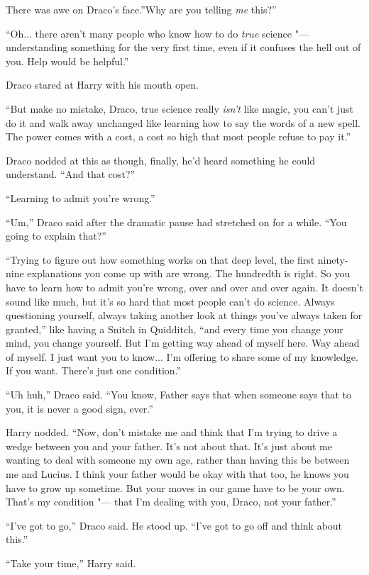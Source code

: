 There was awe on Draco's face.''Why are you telling \emph{me} this?''

``Oh... there aren't many people who know how to do \emph{true}
science "--- understanding something for the very first time, even if it
confuses the hell out of you. Help would be helpful.''

Draco stared at Harry with his mouth open.

``But make no mistake, Draco, true science really \emph{isn't} like
magic, you can't just do it and walk away unchanged like learning how to
say the words of a new spell. The power comes with a cost, a cost so
high that most people refuse to pay it.''

Draco nodded at this as though, finally, he'd heard something he could
understand. ``And that cost?''

``Learning to admit you're wrong.''

``Um,'' Draco said after the dramatic pause had stretched on for a
while. ``You going to explain that?''

``Trying to figure out how something works on that deep level, the first
ninety-nine explanations you come up with are wrong. The hundredth is
right. So you have to learn how to admit you're wrong, over and over and
over again. It doesn't sound like much, but it's so hard that most
people can't do science. Always questioning yourself, always taking
another look at things you've always taken for granted,'' like having a
Snitch in Quidditch, ``and every time you change your mind, you change
yourself. But I'm getting way ahead of myself here. Way ahead of myself.
I just want you to know... I'm offering to share some of my
knowledge. If you want. There's just one condition.''

``Uh huh,'' Draco said. ``You know, Father says that when someone says
that to you, it is never a good sign, ever.''

Harry nodded. ``Now, don't mistake me and think that I'm trying to drive
a wedge between you and your father. It's not about that. It's just
about me wanting to deal with someone my own age, rather than having
this be between me and Lucius. I think your father would be okay with
that too, he knows you have to grow up sometime. But your moves in our
game have to be your own. That's my condition "--- that I'm dealing with
you, Draco, not your father.''

``I've got to go,'' Draco said. He stood up. ``I've got to go off and
think about this.''

``Take your time,'' Harry said.

